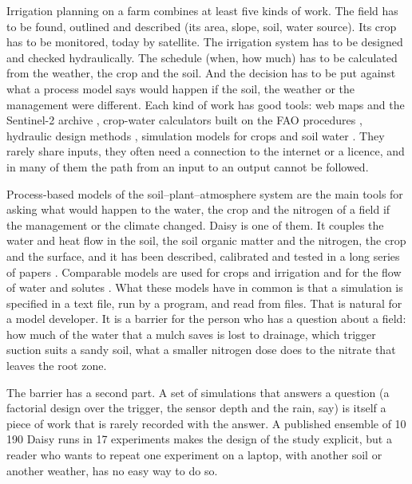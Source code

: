 \documentclass[preprint,12pt]{elsarticle}
\begin{document}
Irrigation planning on a farm combines at least five kinds of work. The field has to be found, outlined and described (its area, slope, soil, water source). Its crop has to be monitored, today by satellite. The irrigation system has to be designed and checked hydraulically. The schedule (when, how much) has to be calculated from the weather, the crop and the soil. And the decision has to be put against what a process model says would happen if the soil, the weather or the management were different. Each kind of work has good tools: web maps and the Sentinel-2 archive \cite{Drusch2012}, crop-water calculators built on the FAO procedures \cite{Allen1998,Doorenbos1979}, hydraulic design methods \cite{Keller1990,Walker1989}, simulation models for crops and soil water \cite{Jones2003,Keating2003,Steduto2009,Simunek2008,Hansen2012}. They rarely share inputs, they often need a connection to the internet or a licence, and in many of them the path from an input to an output cannot be followed.

Process-based models of the soil--plant--atmosphere system are the main tools for asking what would happen to the water, the crop and the nitrogen of a field if the management or the climate changed. Daisy is one of them. It couples the water and heat flow in the soil, the soil organic matter and the nitrogen, the crop and the surface, and it has been described, calibrated and tested in a long series of papers \cite{Hansen1990,Abrahamsen2000,Hansen2012,Holbak2026}. Comparable models are used for crops and irrigation \cite{Jones2003,Keating2003,Steduto2009} and for the flow of water and solutes \cite{Simunek2008,Simunek2016}. What these models have in common is that a simulation is specified in a text file, run by a program, and read from files. That is natural for a model developer. It is a barrier for the person who has a question about a field: how much of the water that a mulch saves is lost to drainage, which trigger suction suits a sandy soil, what a smaller nitrogen dose does to the nitrate that leaves the root zone.

The barrier has a second part. A set of simulations that answers a question (a factorial design over the trigger, the sensor depth and the rain, say) is itself a piece of work that is rarely recorded with the answer. A published ensemble of 10\,190 Daisy runs in 17 experiments \cite{HaliluData} makes the design of the study explicit, but a reader who wants to repeat one experiment on a laptop, with another soil or another weather, has no easy way to do so.
\end{document}
